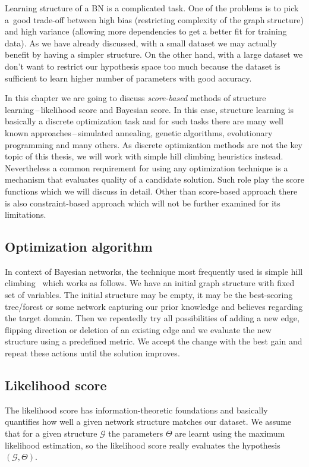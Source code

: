 \documentclass[english,cover]{fitthesis} %
\newcommand{\term}[1]{\emph{#1}}           %
\begin{document}
Learning structure of a BN is a complicated task. One of the problems is to pick a~good trade-off between high bias (restricting complexity of the graph structure) and high variance (allowing more dependencies to get a better fit for training data). As we have already discussed, with a small dataset we may actually benefit by having a simpler structure. On the other hand, with a large dataset we don't want to restrict our hypothesis space too much because the dataset is sufficient to learn higher number of parameters with good accuracy.

In this chapter we are going to discuss \term{score-based} methods of structure learning\,--\,likelihood score and Bayesian score. In this case, structure learning is basically a discrete optimization task and for such tasks there are many well known approaches\,--\,simulated annealing, genetic algorithms, evolutionary programming and many others. As discrete optimization methods are not the key topic of this thesis, we will work with simple hill climbing heuristics instead. Nevertheless a common requirement for using any optimization technique is a mechanism that evaluates quality of a candidate solution. Such role play the score functions which we will discuss in detail.
Other than score-based approach there is also constraint-based approach which will not be further examined for its limitations. %


\subsection{Optimization algorithm}
In context of Bayesian networks, the technique most frequently used is simple hill climbing~\cite{pgm} which works as follows. We have an initial graph structure with fixed set of variables. The initial structure may be empty, it may be the best-scoring tree/forest or some network capturing our prior knowledge and believes regarding the target domain. Then we repeatedly try all possibilities of adding a new edge, flipping direction or deletion of an existing edge and we evaluate the new structure using a predefined metric. We accept the change with the best gain and repeat these actions until the solution improves.
 


\subsection{Likelihood score}
The likelihood score has information-theoretic foundations and basically quantifies how well a given network structure matches our dataset. We assume that for a given structure $\mathcal{G}$ the parameters $\Theta$ are learnt using the maximum likelihood estimation, so the likelihood score really evaluates the hypothesis $(\mathcal{G}, \Theta)$.
\end{document}
